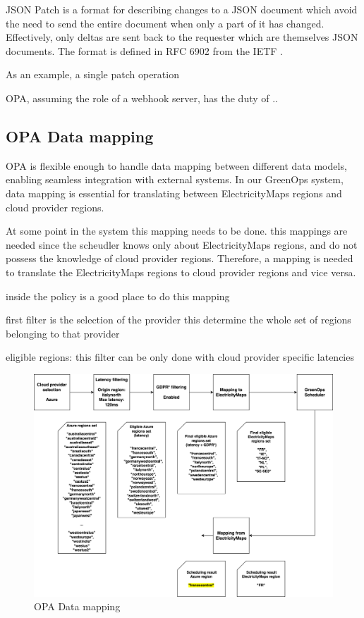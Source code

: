 JSON Patch is a format for describing changes to a JSON document which avoid the need to send the entire document when only a part of it has changed. Effectively, only deltas are sent back to the requester which are themselves JSON documents.
The format is defined in RFC 6902 from the IETF \cite{json_patch}.

As an example, a single patch operation 


OPA, assuming the role of a webhook server, has the duty of ..





\subsection{OPA Data mapping}

OPA is flexible enough to handle data mapping between different data models, enabling seamless integration with external systems. In our GreenOps system, data mapping is essential for translating between ElectricityMaps regions and cloud provider regions. 


At some point in the system this mapping needs to be done.
this mappings are needed since the scheudler knows only about ElectricityMaps regions, and do not possess the knowledge of cloud provider regions. Therefore, a mapping is needed to translate the ElectricityMaps regions to cloud provider regions and vice versa.

inside the policy is a good place to do this mapping


first filter is the selection of the provider
this determine the whole set of regions belonging to that provider

eligible regions: this filter can be only done with cloud provider specific latencies

\begin{figure}[H]
  \centering
  \includegraphics[width=1\linewidth]{images/data_mapping.png}
  \caption{OPA Data mapping}
  \label{fig:data_mapping}
\end{figure}


